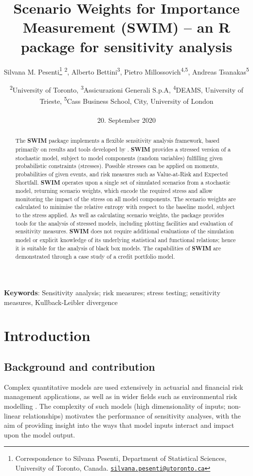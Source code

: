 \documentclass[
]{article}
\title{Scenario Weights for Importance Measurement (\textbf{SWIM}) -- an \textbf{R} package for sensitivity analysis}
\author{Silvana M. Pesenti\footnote{Correspondence to Silvana Pesenti, Department of Statistical Sciences, University of Toronto, Canada. \href{mailto:silvana.pesenti@utoronto.ca}{\nolinkurl{silvana.pesenti@utoronto.ca}}} \textsuperscript{2}, Alberto Bettini\textsuperscript{3}, Pietro Millossovich\textsuperscript{4,5}, Andreas Tsanakas\textsuperscript{5}}
\date{\textsuperscript{2}University of Toronto, \textsuperscript{3}Assicurazioni Generali S.p.A, \textsuperscript{4}DEAMS, University of Trieste, \textsuperscript{5}Cass Business School, City, University of London\\
~\\
20. September 2020}
\begin{document}
\maketitle
\begin{abstract}
The \textbf{SWIM} package implements a flexible sensitivity analysis framework, based primarily on results and tools developed by \citet{Pesenti2019}. \textbf{SWIM} provides a stressed version of a stochastic model, subject to model components (random variables) fulfilling given probabilistic constraints (stresses). Possible stresses can be applied on moments, probabilities of given events, and risk measures such as Value-at-Risk and Expected Shortfall. \textbf{SWIM} operates upon a single set of simulated scenarios from a stochastic model, returning scenario weights, which encode the required stress and allow monitoring the impact of the stress on all model components. The scenario weights are calculated to minimise the relative entropy with respect to the baseline model, subject to the stress applied. As well as calculating scenario weights, the package provides tools for the analysis of stressed models, including plotting facilities and evaluation of sensitivity measures. \textbf{SWIM} does not require additional evaluations of the simulation model or explicit knowledge of its underlying statistical and functional relations; hence it is suitable for the analysis of black box models. The capabilities of \textbf{SWIM} are demonstrated through a case study of a credit portfolio model.
\end{abstract}

\textbf{Keywords}: Sensitivity analysis; risk measures; stress testing; sensitivity measures, Kullback-Leibler divergence

\hypertarget{introduction}{%
\section{Introduction}\label{introduction}}

\hypertarget{background-and-contribution}{%
\subsection{Background and contribution}\label{background-and-contribution}}

Complex quantitative models are used extensively in actuarial and financial risk management applications, as well as in wider fields such as environmental risk modelling \citep{Tsanakas2016b, Borgonovo2016, Pesenti2019}. The complexity of such models (high dimensionality of inputs; non-linear relationships) motivates the performance of sensitivity analyses, with the aim of providing insight into the ways that model inputs interact and impact upon the model output.
\end{document}
